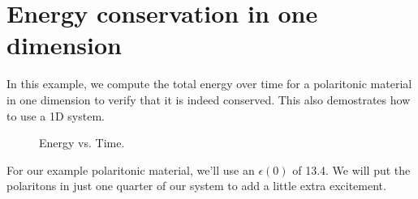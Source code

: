 \begin{comment}
#include <stdio.h>
#include <stdlib.h>
#include <signal.h>
\end{comment}

\section{Energy conservation in one dimension}

In this example, we compute the total energy over time for a polaritonic
material in one dimension to verify that it is indeed conserved.  This also
demostrates how to use a 1D system.

\begin{figure}
\label{econs_1d}
\caption{Energy vs. Time.}
\end{figure}

\begin{comment}
#include "dactyl.h"

const double a = 10;
\end{comment}

For our example polaritonic material, we'll use an $\epsilon(0)$ of 13.4.
We will put the polaritons in just one quarter of our system to add a
little extra excitement.

